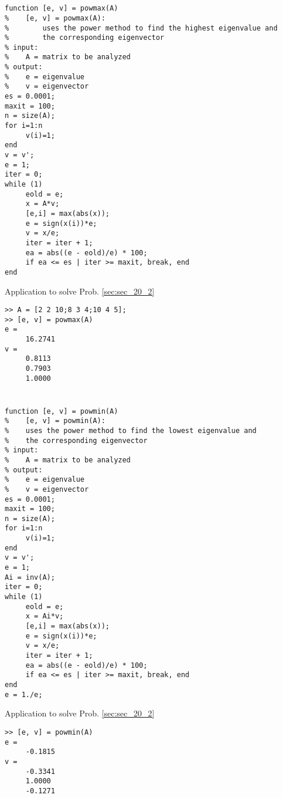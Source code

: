 \documentclass[../main.tex]{subfiles}
\begin{document}
\section{}
\begin{lstlisting}[numbers=none]
function [e, v] = powmax(A)
%	 [e, v] = powmax(A):
%		 uses the power method to find the highest eigenvalue and
%		 the corresponding eigenvector
% input:
%	 A = matrix to be analyzed
% output:
%	 e = eigenvalue
%	 v = eigenvector
es = 0.0001;
maxit = 100;
n = size(A);
for i=1:n
	 v(i)=1;
end
v = v';
e = 1;
iter = 0;
while (1)
	 eold = e;
	 x = A*v;
	 [e,i] = max(abs(x));
	 e = sign(x(i))*e;
	 v = x/e;
	 iter = iter + 1;
	 ea = abs((e - eold)/e) * 100;
	 if ea <= es | iter >= maxit, break, end
end 
\end{lstlisting}
	\bigbreak
Application to solve Prob. \ref{sec:sec_20_2}
	\bigbreak
\begin{lstlisting}[numbers=none]
>> A = [2 2 10;8 3 4;10 4 5];
>> [e, v] = powmax(A)
e =
	 16.2741
v =
	 0.8113
	 0.7903
	 1.0000 
\end{lstlisting}
	\bigbreak



\section{}
\begin{lstlisting}[numbers=none]
function [e, v] = powmin(A)
%	 [e, v] = powmin(A):
%	 uses the power method to find the lowest eigenvalue and
%	 the corresponding eigenvector
% input:
%	 A = matrix to be analyzed
% output:
%	 e = eigenvalue
%	 v = eigenvector
es = 0.0001;
maxit = 100;
n = size(A);
for i=1:n
	 v(i)=1;
end
v = v';
e = 1;
Ai = inv(A);
iter = 0;
while (1)
	 eold = e;
	 x = Ai*v;
	 [e,i] = max(abs(x));
	 e = sign(x(i))*e;
	 v = x/e;
	 iter = iter + 1;
	 ea = abs((e - eold)/e) * 100;
	 if ea <= es | iter >= maxit, break, end
end
e = 1./e; 
\end{lstlisting}
	\bigbreak
Application to solve Prob. \ref{sec:sec_20_2}
	\bigbreak
\begin{lstlisting}[numbers=none]
>> [e, v] = powmin(A)
e =
	 -0.1815
v =
	 -0.3341
	 1.0000
	 -0.1271
\end{lstlisting}
\end{document}
